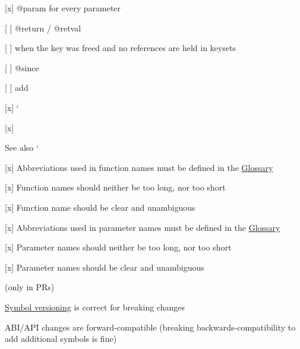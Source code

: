 \begin{DoxyItemize}
\item \mbox{[}x\mbox{]} {\ttfamily @param} for every parameter
\item \mbox{[} \mbox{]} {\ttfamily @return} / {\ttfamily @retval}
\begin{DoxyItemize}
\item \mbox{[} \mbox{]} {} when the key was freed and no references are held in keysets
\end{DoxyItemize}
\item \mbox{[} \mbox{]} {\ttfamily @since}
\begin{DoxyItemize}
\item \mbox{[} \mbox{]} add
\end{DoxyItemize}
\item \mbox{[}x\mbox{]} `{\ttfamily }
\item {\ttfamily \mbox{[}x\mbox{]}}\begin{DoxySeeAlso}{See also}
`
\end{DoxySeeAlso}

\end{DoxyItemize}


\begin{DoxyItemize}
\item \mbox{[}x\mbox{]} Abbreviations used in function names must be defined in the \hyperlink{doc_help_elektra-glossary_md}{Glossary}
\item \mbox{[}x\mbox{]} Function names should neither be too long, nor too short
\item \mbox{[}x\mbox{]} Function name should be clear and unambiguous
\item \mbox{[}x\mbox{]} Abbreviations used in parameter names must be defined in the \hyperlink{doc_help_elektra-glossary_md}{Glossary}
\item \mbox{[}x\mbox{]} Parameter names should neither be too long, nor too short
\item \mbox{[}x\mbox{]} Parameter names should be clear and unambiguous
\end{DoxyItemize}

(only in P\+Rs)


\begin{DoxyItemize}
\item \hyperlink{doc_dev_symbol-versioning_md}{Symbol versioning} is correct for breaking changes
\item A\+B\+I/\+A\+PI changes are forward-\/compatible (breaking backwards-\/compatibility to add additional symbols is fine)
\end{DoxyItemize}


